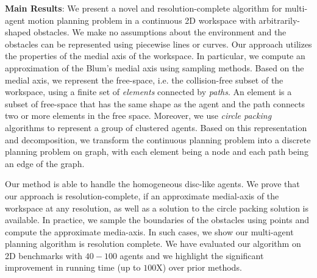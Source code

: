 
\textbf{Main Results}:
We present a novel and resolution-complete algorithm for multi-agent motion planning problem in a continuous 2D workspace with arbitrarily-shaped obstacles. We make no assumptions about the environment and the obstacles can be represented using piecewise lines or curves. Our approach utilizes the properties of the medial axis of the workspace. In particular, we compute an approximation of the Blum's medial axis using sampling methods. Based on the medial axis, we represent the free-space, i.e. the collision-free subset of the workspace, using a finite set of \textit{elements} connected by \textit{paths}. An element is a subset of free-space that has the same shape as the agent and the path connects two or more elements in the free space. Moreover, we use {\em circle packing} algorithms to represent a group of clustered agents.
Based on this representation and decomposition, we transform the continuous planning problem into a discrete planning problem on graph, with each element being a node and each path being an edge of the graph. 



Our method is able to handle the homogeneous disc-like agents. We prove that our approach is resolution-complete, if an approximate medial-axis of the workspace at any resolution, as well as a solution to the circle packing solution is available. In practice, we sample the boundaries of the obstacles using points and compute the approximate media-axis. In such cases, we show our multi-agent planning algorithm is resolution complete. We have evaluated our algorithm on 2D benchmarks with $40-100$ agents and we highlight the significant improvement in running time (up to $100$X) over prior methods.
